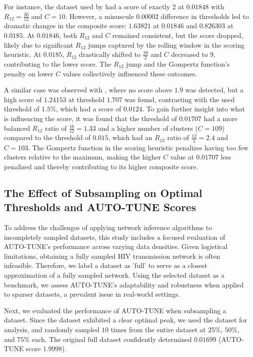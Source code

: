 \documentclass[utf8]{FrontiersinHarvard} %
\begin{document}
For instance, the dataset used by \cite{dalai_combining_2018} had a score of
exactly 2 at \(0.01848\) with \( R_{12} = \frac{26}{12} \) and \( C = 10 \).
However, a minuscule 0.00002 difference in thresholds led to dramatic changes
in the composite score: \(1.63821\) at \(0.01846\) and \(0.826303\) at
\(0.0185\). At \(0.01846\), both \( R_{12} \) and \( C \) remained consistent,
but the score dropped, likely due to significant \( R_{12} \) jumps captured by
the rolling window in the scoring heuristic. At \(0.0185\), \( R_{12} \)
drastically shifted to \(\frac{39}{2}\) and \( C \) decreased to 9,
contributing to the lower score. The \( R_{12} \) jump and the Gompertz
function's penalty on lower \( C \) values collectively influenced these
outcomes.

A similar case was observed with \cite{bbosa_short_2020}, where no score above
$1.9$ was detected, but a high score of $1.24153$ at threshold $1.707$ was
found, contrasting with the used threshold of $1.5\%$, which had a score of
$0.0124$. To gain further insight into what is influencing the score, it was
found that the threshold of \(0.01707\) had a more balanced \( R_{12} \) ratio
of \( \frac{16}{12} = 1.33 \) and a higher number of clusters (\( C = 109 \))
compared to the threshold of \(0.015\), which had an \( R_{12} \) ratio of \(
\frac{12}{5} = 2.4 \) and \( C = 103 \). The Gompertz function in the scoring
heuristic penalizes having too few clusters relative to the maximum, making the
higher \( C \) value at \(0.01707\) less penalized and thereby contributing to
its higher composite score. 

\subsection{The Effect of Subsampling on Optimal Thresholds and AUTO-TUNE Scores}

To address the challenges of applying network inference algorithms to
incompletely sampled datasets, this study includes a focused evaluation of
AUTO-TUNE's performance across varying data densities. Given logistical
limitations, obtaining a fully sampled HIV transmission network is often
infeasible. Therefore, we label a dataset as 'full' to serve as a closest
approximation of a fully sampled network. Using the selected dataset as a
benchmark, we assess AUTO-TUNE's adaptability and robustness when applied to
sparser datasets, a prevalent issue in real-world settings.

Next, we evaluated the performance of AUTO-TUNE when subsampling a dataset.
Since the \citep{rhee_national_2019} dataset exhibited a clear optimal peak, we
used the dataset for analysis, and randomly sampled $10$ times from the entire
dataset at $25\%$, $50\%$, and $75\%$ each. The original full dataset
confidently determined $0.01699$ (AUTO-TUNE score $1.9998$).
\end{document}
